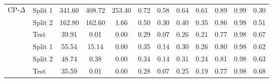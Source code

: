 \begin{table}[!tbp]
{\begin{tabular}{ll|cccccccccc}
& Split 1 & 341.60 & 408.72 & 253.40 & 0.72 & 0.58 & 0.64 & 0.61 & 0.89 & 0.99 & 0.30 \\
& Split 2 & 162.80 & 162.60 & 1.66 & 0.50 & 0.30 & 0.40 & 0.35 & 0.86 & 0.98 & 0.51 \\
& Test    & 39.91 & 0.01 & 0.00 & 0.29 & 0.07 & 0.26 & 0.21 & 0.77 & 0.98 & 0.67 \\
\midrule
{}
& Split 1 & 55.54 & 15.14 & 0.00 & 0.35 & 0.14 & 0.30 & 0.26 & 0.80 & 0.98 & 0.62 \\
& Split 2 & 48.74 & 0.38 & 0.00 & 0.34 & 0.14 & 0.31 & 0.24 & 0.81 & 0.98 & 0.63 \\
& Test    & 35.59 & 0.01 & 0.00 & 0.28 & 0.07 & 0.25 & 0.19 & 0.77 & 0.98 & 0.68 \\
\bottomrule
\end{tabular}}
\end{table}

